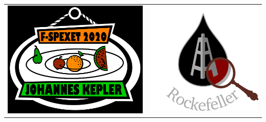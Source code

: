 \begin{center}
\begin{tabular}{cc}
    
    \includegraphics[width=\gamlaAffischerLength]{Bilder/TidigareSpexloggor/logga_kepler.png}&
    \includegraphics[width=\gamlaAffischerLength]{Bilder/TidigareSpexloggor/2021_Rockefeller.png}

\end{tabular}
\end{center}

